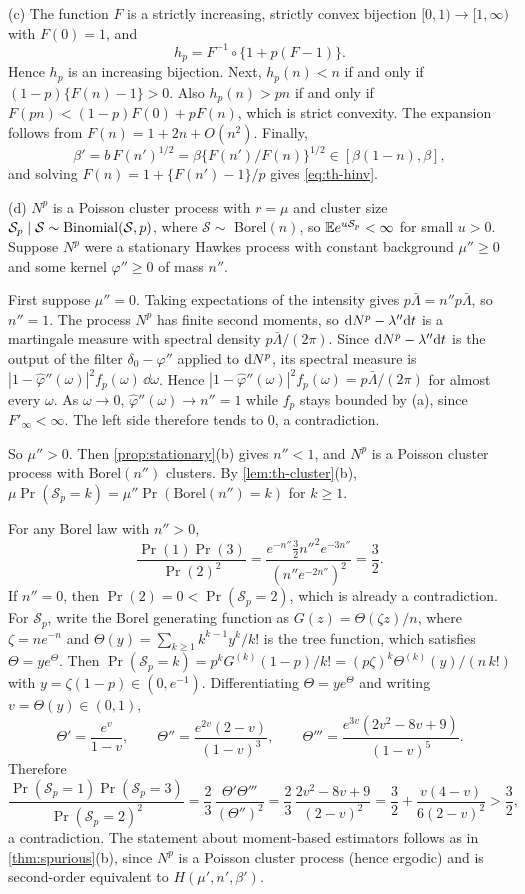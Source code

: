 (c) The function $F$ is a strictly increasing, strictly convex bijection
$[0,1)\to[1,\infty)$ with $F(0)=1$, and
\[
h_p=F^{-1}\circ\{1+p(F-1)\}.
\]
Hence $h_p$ is an increasing bijection. Next, $h_p(n)<n$ if and only if
$(1-p)\{F(n)-1\}>0$. Also $h_p(n)>pn$ if and only if
$F(pn)<(1-p)F(0)+pF(n)$, which is strict convexity. The expansion follows from
$F(n)=1+2n+O(n^2)$. Finally,
\[
\beta'=b\,F(n')^{1/2}=\beta\{F(n')/F(n)\}^{1/2}\in[\beta(1-n),\beta],
\]
and solving $F(n)=1+\{F(n')-1\}/p$ gives \eqref{eq:th-hinv}.

(d) $N^p$ is a Poisson cluster process with $r=\mu$ and cluster size
$\mathcal S_p\mid \mathcal S\sim\operatorname{Binomial}(\mathcal S,p)$, where $\mathcal S\sim$ Borel$(n)$, so $\mathbb{E} e^{u \mathcal S_p}<\infty$ for
small $u>0$. Suppose $N^p$ were a stationary Hawkes process with constant
background $\mu''\ge0$ and some kernel $\varphi''\ge0$ of mass $n''$.

First suppose $\mu''=0$. Taking expectations of the intensity gives
$p\bar\Lambda=n''p\bar\Lambda$, so $n''=1$. The process $N^p$ has finite second
moments, so $\mathrm{d}N^p-\lambda''\mathrm{d} t$ is a martingale measure with spectral density
$p\bar\Lambda/(2\pi)$. Since $\mathrm{d}N^p-\lambda''\mathrm{d} t$ is the output of the filter
$\delta_0-\varphi''$ applied to $\mathrm{d}N^p$, its spectral measure is
$|1-\hat\varphi''(\omega)|^2f_p(\omega)\,\dd\omega$. Hence
$|1-\hat\varphi''(\omega)|^2f_p(\omega)=p\bar\Lambda/(2\pi)$ for almost every $\omega$.
As $\omega\to0$, $\hat\varphi''(\omega)\to n''=1$ while $f_p$ stays bounded by (a),
since $F'_\infty<\infty$. The left side therefore tends to $0$, a contradiction.

So $\mu''>0$. Then \cref{prop:stationary}(b) gives $n''<1$, and $N^p$ is a Poisson
cluster process with Borel$(n'')$ clusters. By
\cref{lem:th-cluster}(b), $\mu\Pr(\mathcal S_p=k)=\mu''\Pr(\text{Borel}(n'')=k)$ for $k\ge1$.

For any Borel law with $n''>0$,
\[
\frac{\Pr(1)\Pr(3)}{\Pr(2)^2}=\frac{e^{-n''}\tfrac32n''^2e^{-3n''}}{(n''e^{-2n''})^2}=\frac32 .
\]
If $n''=0$, then $\Pr(2)=0<\Pr(\mathcal S_p=2)$, which is already a contradiction. For $\mathcal S_p$,
write the Borel generating function as $G(z)=\Theta(\zeta z)/n$, where $\zeta=ne^{-n}$ and
$\Theta(y)=\sum_{k\ge1}k^{k-1}y^k/k!$ is the tree function, which satisfies $\Theta=ye^\Theta$. Then
$\Pr(\mathcal S_p=k)=p^kG^{(k)}(1-p)/k!=(p\zeta)^k\Theta^{(k)}(y)/(n\,k!)$ with
$y=\zeta(1-p)\in(0,e^{-1})$. Differentiating $\Theta=ye^\Theta$ and writing $v=\Theta(y)\in(0,1)$,
\[
\Theta'=\frac{e^v}{1-v},\qquad \Theta''=\frac{e^{2v}(2-v)}{(1-v)^3},\qquad
\Theta'''=\frac{e^{3v}(2v^2-8v+9)}{(1-v)^5}.
\]
Therefore
\[
\frac{\Pr(\mathcal S_p=1)\Pr(\mathcal S_p=3)}{\Pr(\mathcal S_p=2)^2}=\frac23\,\frac{\Theta'\Theta'''}{(\Theta'')^2}
=\frac23\,\frac{2v^2-8v+9}{(2-v)^2}
=\frac32+\frac{v(4-v)}{6(2-v)^2}>\frac32 ,
\]
a contradiction. The statement about moment-based estimators follows as in
\cref{thm:spurious}(b), since $N^p$ is a Poisson cluster process (hence ergodic) and is
second-order equivalent to $H(\mu',n',\beta')$.

